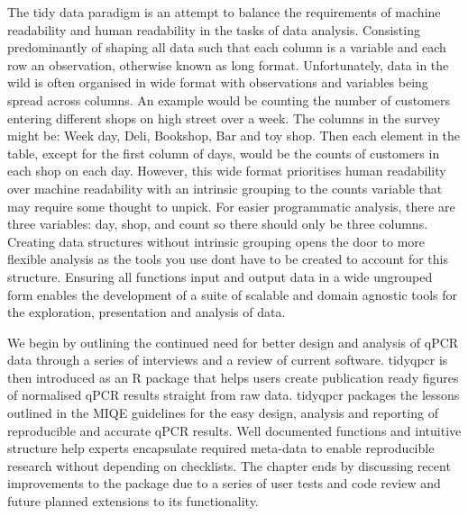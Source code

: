 \documentclass{SBCbookchapter}
\begin{document}
 The tidy data paradigm is an attempt to balance the requirements of machine readability and human readability in the tasks of data analysis. Consisting predominantly of shaping all data such that each column is a variable and each row an observation, otherwise known as long format. Unfortunately, data in the wild is often organised in wide format with observations and variables being spread across columns. An example would be counting the number of customers entering different shops on high street over a week. The columns in the survey might be: Week day, Deli, Bookshop, Bar and toy shop. Then each element in the table, except for the first column of days, would be the counts of customers in each shop on each day. However, this wide format prioritises human readability over machine readability with an intrinsic grouping to the counts variable that may require some thought to unpick. For easier programmatic analysis, there are three variables: day, shop, and count so there should only be three columns. Creating data structures without intrinsic grouping opens the door to more flexible analysis as the tools you use dont have to be created to account for this structure. Ensuring all functions input and output data in a wide ungrouped form enables the development of a suite of scalable and domain agnostic tools for the exploration, presentation and analysis of data.







We begin by outlining the continued need for better design and analysis of qPCR data through a series of interviews and a review of current software.
tidyqpcr is then introduced as an R package that helps users create publication ready figures of normalised qPCR results straight from raw data. 
tidyqpcr packages the lessons outlined in the MIQE guidelines for the easy design, analysis and reporting of reproducible and accurate qPCR results.
Well documented functions and intuitive structure help experts encapsulate required meta-data to enable reproducible research without depending on checklists.
The chapter ends by discussing recent improvements to the package due to a series of user tests and code review and future planned extensions to its functionality.
\end{document}
